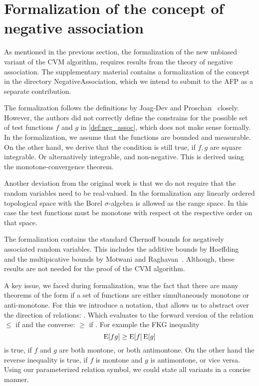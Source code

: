 \section{Formalization of the concept of negative association}\label{sec:formalization_neg_dep}
As mentioned in the previous section, the formalization of the new unbiased variant of the CVM algorithm, requires results from the theory of negative association.
The supplementary material contains a formalization of the concept in the directory Negative{\textunderscore}Association, which we intend to submit to the AFP as a separate contribution.

The formalization follows the definitions by Joag-Dev and Proschan~\cite{joagdev1983} closely.
However, the authors did not correctly define the constrains for the possible set of test functions $f$ and $g$ in \cref{def:neg_assoc}, which does not make sense formally.
In the formalization, we assume that the functions are bounded and measurable.
On the other hand, we derive that the condition is still true, if $f, g$ are square integrable.
Or alternatively integrable, and non-negative.
This is derived using the monotone-convergence theorem.

Another deviation from the original work is that we do not require that the random variables need to be real-valued.
In the formalization any linearly ordered topological space with the Borel $\sigma$-algebra is allowed as the range space.
In this case the test functions must be monotone with respect ot the respective order on that space.

The formalization contains the standard Chernoff bounds for negatively associated random variables.
This includes the additive bounds by Hoeffding~\cite[Th. 1, 2]{hoeffding1963} and the multipicative bounds by Motwani and Raghavan~\cite[Th. 4.1, 4.2]{motwani1995}.
Although, these results are not needed for the proof of the CVM algorithm.

A key issue, we faced during formalization, was the fact that there are many theorems of the form if a set of functions are either simultaneously monotone or anti-monotone.
For this we introduce a notation, that allows us to abstract over the direction of relations: \isa{\isasymle\isasymge\isactrlbsub\isasymeta\isactrlesub}.
Which evaluates to the forward version of the relation $\leq$ if  and the converse: $\geq$ if .
For example the FKG inequality
\[
  \operatorname{\mathrm{E}} [f g] \geq \operatorname{\mathrm{E}} [f] \operatorname{\mathrm{E}} [g]
\]
is true, if $f$ and $g$ are both montone, or both antimontone.
On the other hand the reverse inequality is true, if $f$ is montone and $g$ is antimontone, or vice versa.
Using our parameterized relation symbol, we could state all variants in a concise manner.


